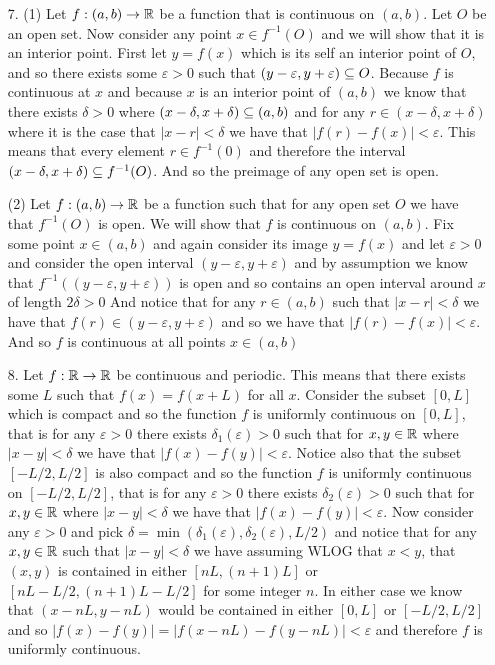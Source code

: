\documentclass[12pt]{amsart}
\begin{document}
\begin{itemize}
    \item[7.] (1) Let $f:(a,b)\rightarrow\mathbb{R}$ be a function that is continuous on $(a,b)$. 
               Let $O$ be an open set. 
               Now consider any point $x\in f^{-1}(O)$ and we will show that it is an interior point. First let $y=f(x)$
               which is its self an interior point of $O$, and so there exists some $\varepsilon>0$ 
               such that $(y-\varepsilon, y+\varepsilon)\subseteq O$. Because $f$ is continuous at $x$ and because $x$ is an 
               interior point of $(a,b)$ we know that there exists $\delta>0$ 
               where $(x-\delta,x+\delta)\subseteq (a,b)$ and for any $r\in (x-\delta,x+\delta)$ where it is the case that  $|x-r|<\delta$ 
               we have that $|f(r)-f(x)|<\varepsilon$. This means that every element $r\in f^{-1}(0)$
               and therefore the interval $(x-\delta,x+\delta)\subseteq f^{-1}(O)$.
                And so the preimage of any open set is open.
               

               (2) Let $f:(a,b)\rightarrow\mathbb{R}$ be a function such that for any open set $O$ we have that $f^{-1}(O)$ is open.
               We will show that $f$ is continuous on $(a,b)$. Fix some point $x\in (a,b)$ and again consider its image $y=f(x)$ and let 
               $\varepsilon>0$ and consider the open interval $(y-\varepsilon, y+\varepsilon)$ and by assumption we know that 
               $f^{-1}((y-\varepsilon, y+\varepsilon))$ is open and so contains an open interval around $x$ of length $2\delta>0$
               And notice that for any $r\in (a,b)$ such that $|x-r|<\delta$ we have that $f(r)\in(y-\varepsilon, y+\varepsilon)$ and so
               we have that $|f(r)-f(x)|<\varepsilon$. And so $f$ is continuous at all points $x\in(a,b)$


    \item[8.] Let $f:\mathbb{R}\rightarrow \mathbb{R}$ be continuous and periodic. This means that there exists some $L$ such that $f(x)=f(x+L)$ for all $x$. 
    Consider the subset $[0,L]$ which is compact and so the function $f$ is uniformly continuous on $[0,L]$, that is for any 
    $\varepsilon>0$ there exists $\delta_1(\varepsilon)>0$ such that for $x,y\in\mathbb{R}$ where $|x-y|<\delta$ we have that $|f(x)-f(y)|<\varepsilon$.
    Notice also that the subset $[-L/2,L/2]$ is also compact and so the function $f$ is uniformly continuous on $[-L/2,L/2]$, that is for any 
    $\varepsilon>0$ there exists $\delta_2(\varepsilon)>0$ such that for $x,y\in\mathbb{R}$ where $|x-y|<\delta$ we have that $|f(x)-f(y)|<\varepsilon$. 
    Now consider any $\varepsilon >0$ and pick $\delta=\min(\delta_1(\varepsilon),\delta_2(\varepsilon), L/2)$ and notice that for any $x,y\in\mathbb{R}$ such that $|x-y|<\delta$
    we have assuming WLOG that $x<y$, that $(x,y)$ is contained in either $[nL,(n+1)L]$ or $[nL-L/2,(n+1)L-L/2]$ for some integer $n$. 
    In either case we know that $(x-nL,y-nL)$ would be contained in either $[0,L]$ or $[-L/2,L/2]$ and so $|f(x)-f(y)|=|f(x-nL)-f(y-nL)|<\varepsilon$ and therefore 
    $f$ is uniformly continuous.



\end{itemize}
\end{document}
